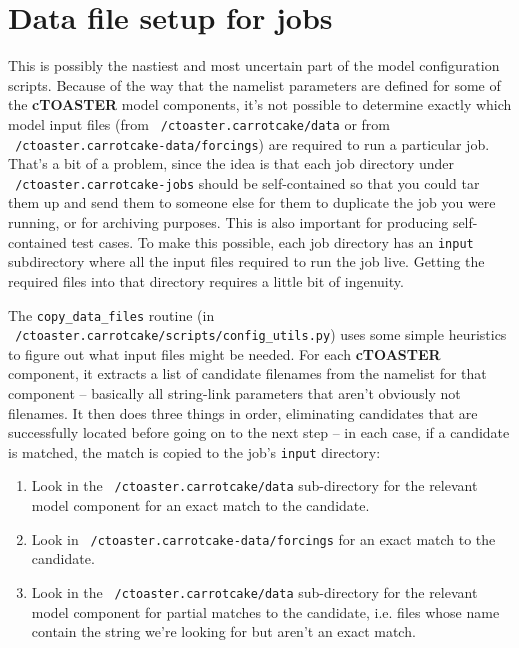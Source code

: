 \documentclass[a4paper,10pt,article]{memoir}
\begin{document}
\section{Data file setup for jobs}

This is possibly the nastiest and most uncertain part of the model
configuration scripts.  Because of the way that the namelist
parameters are defined for some of the \textbf{cTOASTER} model components, it's
not possible to determine exactly which model input files (from
\texttt{~/ctoaster.carrotcake/data} or from 
\\\texttt{~/ctoaster.carrotcake-data/forcings}) are
required to run a particular job.  That's a bit of a problem, since
the idea is that each job directory under \texttt{~/ctoaster.carrotcake-jobs}
should be self-contained so that you could tar them up and send them
to someone else for them to duplicate the job you were running, or for
archiving purposes.  This is also important for producing
self-contained test cases.  To make this possible, each job directory
has an \texttt{input} subdirectory where all the input files required
to run the job live.  Getting the required files into that directory
requires a little bit of ingenuity.

The \texttt{copy\_data\_files} routine (in
\texttt{~/ctoaster.carrotcake/scripts/config\_utils.py}) uses some simple
heuristics to figure out what input files might be needed.  For each
\textbf{cTOASTER} component, it extracts a list of candidate filenames from the
namelist for that component -- basically all string-link parameters
that aren't obviously not filenames.  It then does three things in
order, eliminating candidates that are successfully located before
going on to the next step -- in each case, if a candidate is matched,
the match is copied to the job's \texttt{input} directory:
\begin{enumerate}
  \item{Look in the \texttt{~/ctoaster.carrotcake/data} sub-directory for the
    relevant model component for an exact match to the candidate.}
  \item{Look in \texttt{~/ctoaster.carrotcake-data/forcings} for an exact match to
    the candidate.}
  \item{Look in the \texttt{~/ctoaster.carrotcake/data} sub-directory for the
    relevant model component for partial matches to the candidate,
    i.e. files whose name contain the string we're looking for but
    aren't an exact match.}
\end{enumerate}
\end{document}
